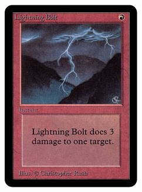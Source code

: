 \documentclass{beamer}
\begin{document}
\begin{frame}
\begin{columns}
\begin{column}{.5\textwidth}
{                    \includegraphics[width=\textwidth] {./img/lightning_bolt/main.jpg}
                }
                 {
}
\end{column}
\end{columns}
\end{frame}
\end{document}
